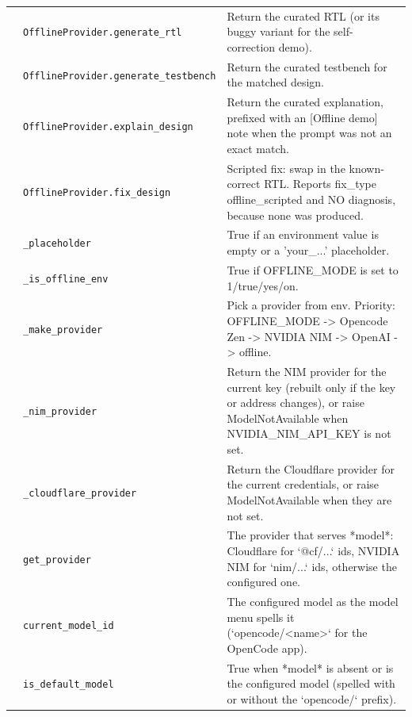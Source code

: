 \begin{longtable}{@{}p{2.8cm}>{\raggedright\arraybackslash}p{4.6cm}p{7.9cm}@{}}
{\small } & \texttt{\small OfflineProvider.\allowbreak generate\_\allowbreak{}rtl} & Return the curated RTL (or its buggy variant for the self-correction demo). \\
{\small } & \texttt{\small OfflineProvider.\allowbreak generate\_\allowbreak{}testbench} & Return the curated testbench for the matched design. \\
{\small } & \texttt{\small OfflineProvider.\allowbreak explain\_\allowbreak{}design} & Return the curated explanation, prefixed with an [Offline demo] note when the prompt was not an exact match. \\
{\small } & \texttt{\small OfflineProvider.\allowbreak fix\_\allowbreak{}design} & Scripted fix: swap in the known-correct RTL. Reports fix\_type offline\_scripted and NO diagnosis, because none was produced. \\
{\small } & \texttt{\small \_\allowbreak{}placeholder} & True if an environment value is empty or a 'your\_...' placeholder. \\
{\small } & \texttt{\small \_\allowbreak{}is\_\allowbreak{}offline\_\allowbreak{}env} & True if OFFLINE\_MODE is set to 1/true/yes/on. \\
{\small } & \texttt{\small \_\allowbreak{}make\_\allowbreak{}provider} & Pick a provider from env. Priority: OFFLINE\_MODE -\textgreater{} Opencode Zen -\textgreater{} NVIDIA NIM -\textgreater{} OpenAI -\textgreater{} offline. \\
{\small } & \texttt{\small \_\allowbreak{}nim\_\allowbreak{}provider} & Return the NIM provider for the current key (rebuilt only if the key or address changes), or raise ModelNotAvailable when NVIDIA\_NIM\_API\_KEY is not set. \\
{\small } & \texttt{\small \_\allowbreak{}cloudflare\_\allowbreak{}provider} & Return the Cloudflare provider for the current credentials, or raise ModelNotAvailable when they are not set. \\
{\small } & \texttt{\small get\_\allowbreak{}provider} & The provider that serves *model*: Cloudflare for `@cf/...` ids, NVIDIA NIM for `nim/...` ids, otherwise the configured one. \\
{\small } & \texttt{\small current\_\allowbreak{}model\_\allowbreak{}id} & The configured model as the model menu spells it (`opencode/\textless{}name\textgreater{}` for the OpenCode app). \\
{\small } & \texttt{\small is\_\allowbreak{}default\_\allowbreak{}model} & True when *model* is absent or is the configured model (spelled with or without the `opencode/` prefix). \\

\end{longtable}
